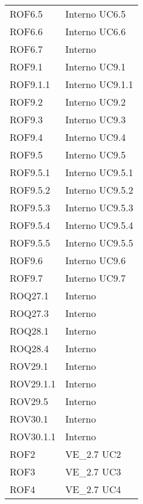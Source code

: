 \begin{longtable}{p{2.5cm}!{\VRule[1pt]}p{2.5cm}}
ROF6.5 & Interno \newline UC6.5
 \\
ROF6.6 & Interno \newline UC6.6
 \\
ROF6.7 & Interno \\
ROF9.1 & Interno \newline UC9.1
 \\
ROF9.1.1 & Interno \newline UC9.1.1
 \\
ROF9.2 & Interno \newline UC9.2
 \\
ROF9.3 & Interno \newline UC9.3
 \\
ROF9.4 & Interno \newline UC9.4
 \\
ROF9.5 & Interno \newline UC9.5
 \\
ROF9.5.1 & Interno \newline UC9.5.1
 \\
ROF9.5.2 & Interno \newline UC9.5.2
 \\
ROF9.5.3 & Interno \newline UC9.5.3
 \\
ROF9.5.4 & Interno \newline UC9.5.4
 \\
ROF9.5.5 & Interno \newline UC9.5.5
 \\
ROF9.6 & Interno \newline UC9.6
 \\
ROF9.7 & Interno \newline UC9.7
 \\
ROQ27.1 & Interno \\
ROQ27.3 & Interno \\
ROQ28.1 & Interno \\
ROQ28.4 & Interno \\
ROV29.1 & Interno \\
ROV29.1.1 & Interno \\
ROV29.5 & Interno \\
ROV30.1 & Interno \\
ROV30.1.1 & Interno \\
ROF2 & VE_2.7 \newline UC2
 \\
ROF3 & VE_2.7 \newline UC3
 \\
ROF4 & VE_2.7 \newline UC4

\end{longtable}
